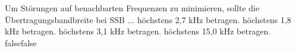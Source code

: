     {Um Störungen auf benachbarten Frequenzen zu minimieren, sollte die Übertragungsbandbreite bei SSB ...}
    {höchstens 2,7 kHz betragen.}
    {höchstens 1,8 kHz betragen.}
    {höchstens 3,1 kHz betragen.}
    {höchstens 15,0 kHz betragen.}
    {false}{false}
